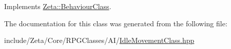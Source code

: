 Implements \hyperlink{classZeta_1_1BehaviourClass_aeaf604f49cc95501422dfd177de64287}{Zeta\+::\+Behaviour\+Class}.



The documentation for this class was generated from the following file\+:\begin{DoxyCompactItemize}
\item 
include/\+Zeta/\+Core/\+R\+P\+G\+Classes/\+A\+I/\hyperlink{IdleMovementClass_8hpp}{Idle\+Movement\+Class.\+hpp}\end{DoxyCompactItemize}
